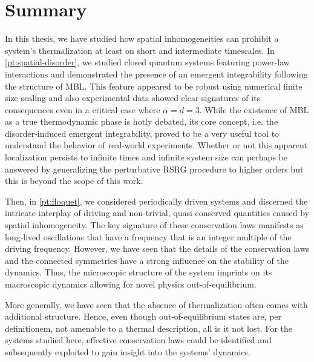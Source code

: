 \chapter*{Summary}
\label{pt:summary}
In this thesis, we have studied how spatial inhomogeneities can prohibit a system's thermalization at least on short and intermediate timescales. In \autoref{pt:spatial-disorder}, we studied closed quantum systems featuring power-law interactions and demonstrated the presence of an emergent integrability following the structure of MBL. This feature appeared to be robust using numerical finite size scaling and also experimental data showed clear signatures of its consequences even in a critical case where $\alpha=d=3$. While the existence of MBL as a true thermodynamic phase is hotly debated, its core concept, i.e. the disorder-induced emergent integrability, proved to be a very useful tool to understand the behavior of real-world experiments. Whether or not this apparent localization persists to infinite times and infinite system size can perhaps be answered by generalizing the perturbative RSRG procedure to higher orders but this is beyond the scope of this work.

Then, in \autoref{pt:floquet}, we considered periodically driven systems and discerned the intricate interplay of driving and non-trivial, quasi-conserved quantities caused by spatial inhomogeneity. The key signature of these conservation laws manifests as long-lived oscillations that have a frequency that is an integer multiple of the driving frequency. However, we have seen that the details of the conservation laws and the connected symmetries have a strong influence on the stability of the dynamics.
Thus, the microscopic structure of the system imprints on its macroscopic dynamics allowing for novel physics out-of-equilibrium.

More generally, we have seen that the absence of thermalization often comes with additional structure.
Hence, even though out-of-equilibrium states are, per definitionem, not amenable to a thermal description, all is it not lost. For the systems studied here, effective conservation laws could be identified and subsequently exploited to gain insight into the systems' dynamics.


